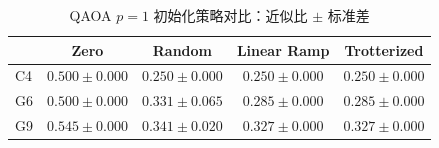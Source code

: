 \begin{table}[htbp]
  \centering
  \caption{QAOA $p=1$ 初始化策略对比：近似比 $\pm$ 标准差}
  \label{tab:init_comparison}
  \begin{tabular}{lcccc}
    \toprule
    & \textbf{Zero} & \textbf{Random} & \textbf{Linear Ramp} & \textbf{Trotterized} \\
    \midrule
    C4 & $0.500 \pm 0.000$ & $0.250 \pm 0.000$ & $0.250 \pm 0.000$ & $0.250 \pm 0.000$ \\
    G6 & $0.500 \pm 0.000$ & $0.331 \pm 0.065$ & $0.285 \pm 0.000$ & $0.285 \pm 0.000$ \\
    G9 & $0.545 \pm 0.000$ & $0.341 \pm 0.020$ & $0.327 \pm 0.000$ & $0.327 \pm 0.000$ \\
    \bottomrule
  \end{tabular}
\end{table}
